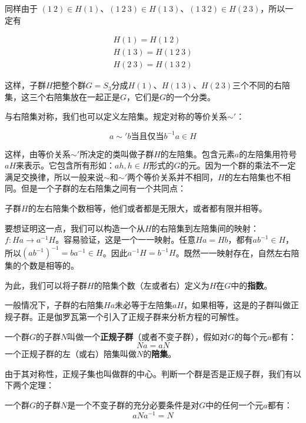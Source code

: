 \documentclass[b5paper]{ctexart}
\begin{document}
同样由于
$(1\ 2) \in H(1)$、$(1\ 2\ 3) \in H(1\ 3)$、$(1\ 3\ 2) \in H(2\ 3)$，所以一定有

\[
\begin{array}{l}
H(1) = H(1\ 2) \\
H(1\ 3) = H(1\ 2\ 3) \\
H(2\ 3) = H(1\ 3\ 2)
\end{array}
\]

这样，子群$H$把整个群$G = S_3$分成$H(1)$、$H(1\ 3)$、$H(2\ 3)$三个不同的右陪集，这三个右陪集放在一起正是$G$，它们是$G$的一个分类。

与右陪集对称，我们也可以定义左陪集。规定对称的等价关系$\sim'$：

\[
a \sim' b \text{当且仅当} b^{-1}a \in H
\]

这样，由等价关系$\sim'$所决定的类叫做子群$H$的左陪集。包含元素$a$的左陪集用符号$aH$来表示。它包含所有形如：$ah, h \in H$形式的$G$的元。因为一个群的乘法不一定满足交换律，所以一般来说$\sim$和$\sim'$两个等价关系并不相同，$H$的左右陪集也不相同。但是一个子群的左右陪集之间有一个共同点：

\begin{theorem}
子群$H$的左右陪集个数相等，他们或者都是无限大，或者都有限并相等。
\end{theorem}

要想证明这一点，我们可以构造一个从$H$的右陪集到左陪集间的映射：$f: Ha \to a^{-1}H$。容易验证，这是一个一一映射。任意$Ha = Hb$，都有$ab^{-1} \in H$，所以$(ab^{-1})^{-1} = ba^{-1} \in H$。因此$a^{-1}H= b^{-1}H$。既然一一映射存在，自然左右陪集的个数是相等的。

为此，我们可以将子群$H$的陪集个数（左或者右）定义为$H$在$G$中的\textbf{指数}。

一般情况下，子群的右陪集$Ha$未必等于左陪集$aH$，如果相等，这是的子群叫做正规子群。正是伽罗瓦第一个引入了正规子群来分析方程的可解性。

 
\begin{definition}
一个群$G$的子群$N$叫做一个\textbf{正规子群}（或者不变子群），假如对$G$的每个元$a$都有：
\[
Na = aN
\]
一个正规子群的左（或右）陪集叫做$N$的\textbf{陪集}。
\label{normal-subgroup}
\end{definition}

由于其对称性，正规子集也叫做群的中心。判断一个群是否是正规子群，我们有以下两个定理：

\begin{theorem}
一个群$G$的子群$N$是一个不变子群的充分必要条件是对$G$中的任何一个元$a$都有：
\[
aNa^{-1} = N
\]
\end{theorem}
\end{document}
